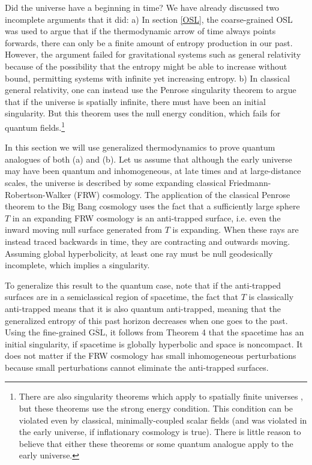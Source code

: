 \documentclass[12pt]{article}
\begin{document}
Did the universe have a beginning in time?  We have already discussed two incomplete arguments that it did:  a) In section \ref{OSL}, the coarse-grained OSL was used to argue that if the thermodynamic arrow of time always points forwards, there can only be a finite amount of entropy production in our past.  However, the argument failed for gravitational systems such as general relativity because of the possibility that the entropy might be able to increase without bound, permitting systems with infinite yet increasing entropy.  b) In classical general relativity, one can instead use the Penrose singularity theorem to argue that if the universe is spatially infinite, there must have been an initial singularity.  But this theorem uses the null energy condition, which fails for quantum fields.\footnote{There are also singularity theorems which apply to spatially finite universes \cite{HawkingEllis}, but these theorems use the strong energy condition.  This condition can be violated even by classical, minimally-coupled scalar fields (and was violated in the early universe, if inflationary cosmology is true).  There is little reason to believe that either these theorems or some quantum analogue apply to the early universe.}

In this section we will use generalized thermodynamics to prove quantum analogues of both (a) and (b).  Let us assume that although the early universe may have been quantum and inhomogeneous, at late times and at large-distance scales, the universe is described by some expanding classical Friedmann-Robertson-Walker (FRW) cosmology.  The application of the classical Penrose theorem to the Big Bang cosmology uses the fact that a sufficiently large sphere $T$ in an expanding FRW cosmology is an anti-trapped surface, i.e. even the inward moving null surface generated from $T$ is expanding.  When these rays are instead traced backwards in time, they are contracting and outwards moving.  Assuming global hyperbolicity, at least one ray must be null geodesically incomplete, which implies a singularity.

To generalize this result to the quantum case, note that if the anti-trapped surfaces are in a semiclassical region of spacetime, the fact that $T$ is classically anti-trapped means that it is also quantum anti-trapped, meaning that the generalized entropy of this past horizon decreases when one goes to the past.  Using the fine-grained $\overline{\mathrm{GSL}}$, it follows from Theorem 4 that the spacetime has an initial singularity, if spacetime is globally hyperbolic and space is noncompact.  It does not matter if the FRW cosmology has small inhomogeneous perturbations because small perturbations cannot eliminate the anti-trapped surfaces.
\end{document}
